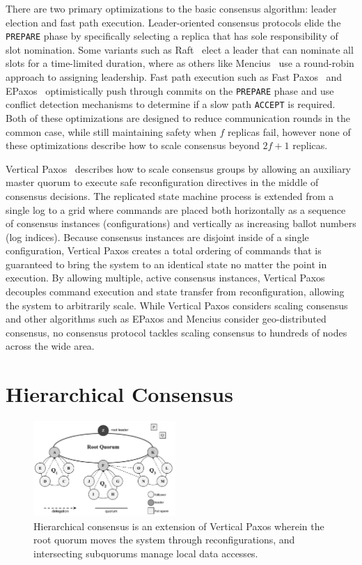 \documentclass[10pt,conference]{IEEEtran}
\newcommand{\Hc}{Hierarchical consensus\xspace}
\newcommand{\subs}{subquorums\xspace}
\newcommand{\roo}{root quorum\xspace}
\begin{document}
There are two primary optimizations to the basic consensus algorithm: leader election
and fast path execution.
Leader-oriented consensus protocols elide the \texttt{PREPARE} phase by specifically
selecting a replica that has sole responsibility of slot nomination.
Some variants such as Raft~\cite{raft} elect a leader that can nominate all slots for
a time-limited duration, where as others like Mencius~\cite{mencius} use a round-robin
approach to assigning leadership.
Fast path execution such as Fast Paxos~\cite{fast_paxos} and EPaxos~\cite{epaxos}
optimistically push through commits on the \texttt{PREPARE} phase and use conflict
detection mechanisms to determine if a slow path \texttt{ACCEPT} is required.
Both of these optimizations are designed to reduce communication rounds in the common
case, while still maintaining safety when $f$ replicas fail, however none of these
optimizations describe how to scale consensus beyond $2f+1$ replicas.

Vertical Paxos~\cite{vertical_paxos,niobe} describes how to scale consensus groups by
allowing an auxiliary master quorum to execute safe reconfiguration directives in the
middle of consensus decisions.
The replicated state machine process is extended from a single log to a grid where
commands are placed both horizontally as a sequence of consensus instances
(configurations) and vertically as increasing ballot numbers (log indices).
Because consensus instances are disjoint inside of a single configuration, Vertical
Paxos creates a total ordering of commands that is guaranteed to bring the system to
an identical state no matter the point in execution.
By allowing multiple, active consensus instances, Vertical Paxos decouples command
execution and state transfer from reconfiguration, allowing the system to arbitrarily
scale.
While Vertical Paxos considers scaling consensus and other algorithms such as EPaxos and
Mencius consider geo-distributed consensus, no consensus protocol tackles scaling
consensus to hundreds of nodes across the wide area.

\section{Hierarchical Consensus}
\label{section:hc}

\begin{figure}[t]
    \centering
    \includegraphics[width=0.48\textwidth]{figures/election3}
    \caption{\Hc is an extension of Vertical Paxos wherein the \roo moves the system
    through reconfigurations, and intersecting \subs manage local data accesses.}
    \label{fig:system}
\end{figure}
\end{document}
